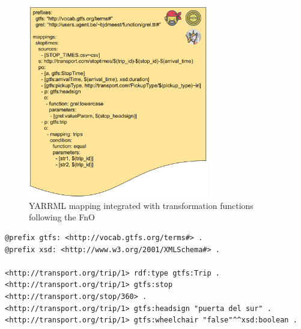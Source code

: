 \begin{figure}[!ht]
\centering
\includegraphics[width=0.7\textwidth]{figures/state-of-the-art/YARRRML+FnO.pdf}
\caption{YARRML mapping integrated with transformation functions following the FnO}
\label{fig:soa_yarrrml_fno}
\end{figure}


\begin{lstlisting}[float,caption=RDF graph generated by RML+FnO mapping,frame=tlrb,label={list:soa_fno_example}, columns=fullflexible]
@prefix gtfs: <http://vocab.gtfs.org/terms#> .
@prefix xsd: <http://www.w3.org/2001/XMLSchema#> .

<http://transport.org/trip/1> rdf:type gtfs:Trip .
<http://transport.org/trip/1> gtfs:stop <http://transport.org/stop/360> .
<http://transport.org/trip/1> gtfs:headsign "puerta del sur" .
<http://transport.org/trip/1> gtfs:wheelchair "false"^^xsd:boolean .
\end{lstlisting}

